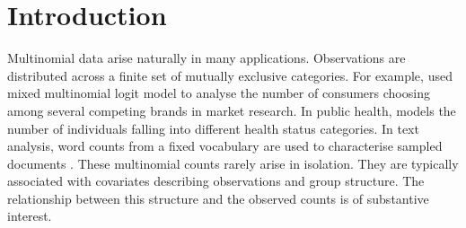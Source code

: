 \chapter{Introduction}
\label{cha:intro}


Multinomial data arise naturally in many applications. Observations are distributed across a finite set of mutually exclusive categories. For example, \citet{Zhang2026} used mixed multinomial logit model to analyse the number of consumers choosing among several competing brands in market research. In public health, \citet{Beltran2024} models the number of individuals falling into different health status categories. In text analysis, word counts from a fixed vocabulary are used to characterise sampled documents \citep{Taddy2015}. These multinomial counts rarely arise in isolation. They are typically associated with covariates describing observations and group structure. The relationship between this structure and the observed counts is of substantive interest. 

